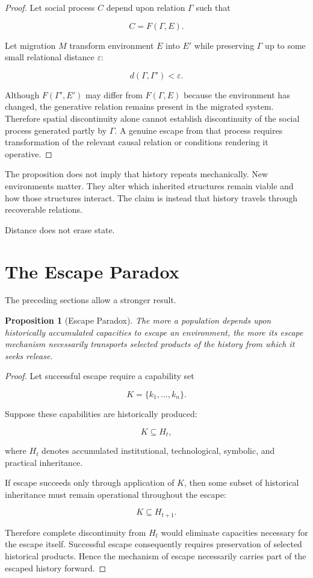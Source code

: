 \documentclass[11pt,oneside]{book}
\newtheorem{proposition}[theorem]{Proposition}
\theoremstyle{definition}
\theoremstyle{remark}
\begin{document}
\begin{proof}
Let social process \(C\) depend upon relation \(\Gamma\) such that

\[
C=F(\Gamma,E).
\]

Let migration \(M\) transform environment \(E\) into \(E'\) while preserving \(\Gamma\) up to some small relational distance \(\varepsilon\):

\[
d(\Gamma,\Gamma')<\varepsilon.
\]

Although \(F(\Gamma',E')\) may differ from \(F(\Gamma,E)\) because the environment has changed, the generative relation remains present in the migrated system. Therefore spatial discontinuity alone cannot establish discontinuity of the social process generated partly by \(\Gamma\). A genuine escape from that process requires transformation of the relevant causal relation or conditions rendering it operative.
\end{proof}

The proposition does not imply that history repeats mechanically. New environments matter. They alter which inherited structures remain viable and how those structures interact. The claim is instead that history travels through recoverable relations.

Distance does not erase state.

\section{The Escape Paradox}

The preceding sections allow a stronger result.

\begin{proposition}[Escape Paradox]
The more a population depends upon historically accumulated capacities to escape an environment, the more its escape mechanism necessarily transports selected products of the history from which it seeks release.
\end{proposition}

\begin{proof}
Let successful escape require a capability set

\[
K=\{k_1,\ldots,k_n\}.
\]

Suppose these capabilities are historically produced:

\[
K\subseteq H_t,
\]

where \(H_t\) denotes accumulated institutional, technological, symbolic, and practical inheritance.

If escape succeeds only through application of \(K\), then some subset of historical inheritance must remain operational throughout the escape:

\[
K\subseteq H_{t+1}.
\]

Therefore complete discontinuity from \(H_t\) would eliminate capacities necessary for the escape itself. Successful escape consequently requires preservation of selected historical products. Hence the mechanism of escape necessarily carries part of the escaped history forward.
\end{proof}
\end{document}
